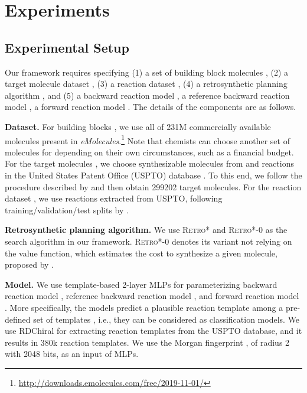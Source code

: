 \section{Experiments}

\subsection{Experimental Setup}







Our framework requires specifying 
(1) a set of building block molecules , (2) a target molecule dataset , (3) a reaction dataset , (4) a retrosynthetic planning algorithm , and (5) a backward reaction model , a reference backward reaction model , a forward reaction model . The details of the components are as follows.


\textbf{Dataset.}
For building blocks , we use all of 231M commercially available molecules present in \emph{eMolecules}.\footnote{\url{http://downloads.emolecules.com/free/2019-11-01/}} Note that chemists can choose another set of molecules for  depending on their own circumstances, such as a financial budget. For the target molecules , we choose synthesizable molecules from  and reactions in the United States Patent Office (USPTO) database \citep{lowe2012extraction}. To this end, we follow the procedure described by \citet{chen2020retro} and then obtain 299202 target molecules. For the reaction dataset , we use reactions extracted from USPTO, following training/validation/test splits by \citet{chen2020retro}.

\textbf{Retrosynthetic planning algorithm.}
We use \textsc{Retro*} and \textsc{Retro*-0} \citep{chen2020retro} as the search algorithm  in our framework. \textsc{Retro*-0} denotes its variant not relying on the value function, which estimates the cost to synthesize a given molecule, proposed by \citet{chen2020retro}. 

\textbf{Model.}
We use template-based 2-layer MLPs \cite{segler2017neural} for parameterizing backward reaction model , reference backward reaction model , and forward reaction model . More specifically, the models predict a plausible reaction template among a pre-defined set of templates , i.e., they can be considered as classification models. 
We use RDChiral \citep{coley2019rdchiral} for extracting reaction templates from the USPTO database, and it results in 380k reaction templates. We use the Morgan fingerprint \citep{rogers2010extended}, of radius 2 with 2048 bits, as an input of MLPs.

